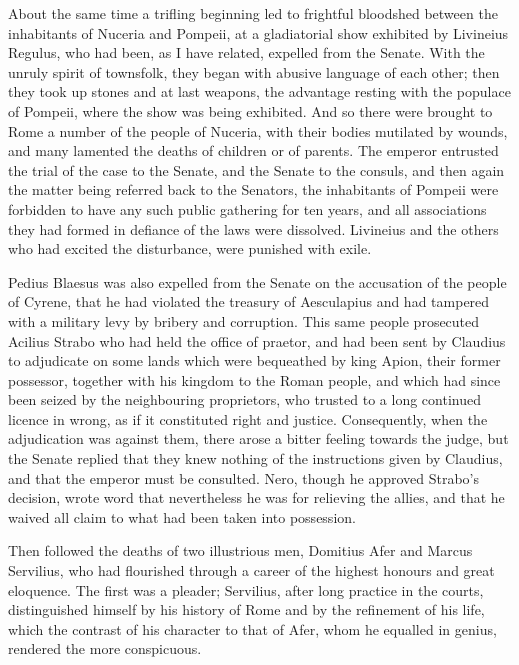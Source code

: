 
About the same time a trifling beginning led to frightful bloodshed between the inhabitants of Nuceria and Pompeii, at a gladiatorial show exhibited by Livineius Regulus, who had been, as I have related, expelled from the Senate. With the unruly spirit of townsfolk, they began with abusive language of each other; then they took up stones and at last weapons, the advantage resting with the populace of Pompeii, where the show was being exhibited. And so there were brought to Rome a number of the people of Nuceria, with their bodies mutilated by wounds, and many lamented the deaths of children or of parents. The emperor entrusted the trial of the case to the Senate, and the Senate to the consuls, and then again the matter being referred back to the Senators, the inhabitants of Pompeii were forbidden to have any such public gathering for ten years, and all associations they had formed in defiance of the laws were dissolved. Livineius and the others who had excited the disturbance, were punished with exile.


Pedius Blaesus was also expelled from the Senate on the accusation of the people of Cyrene, that he had violated the treasury of Aesculapius and had tampered with a military levy by bribery and corruption. This same people prosecuted Acilius Strabo who had held the office of praetor, and had been sent by Claudius to adjudicate on some lands which were bequeathed by king Apion, their former possessor, together with his kingdom to the Roman people, and which had since been seized by the neighbouring proprietors, who trusted to a long continued licence in wrong, as if it constituted right and justice. Consequently, when the adjudication was against them, there arose a bitter feeling towards the judge, but the Senate replied that they knew nothing of the instructions given by Claudius, and that the emperor must be consulted. Nero, though he approved Strabo's decision, wrote word that nevertheless he was for relieving the allies, and that he waived all claim to what had been taken into possession.


Then followed the deaths of two illustrious men, Domitius Afer and Marcus Servilius, who had flourished through a career of the highest honours and great eloquence. The first was a pleader; Servilius, after long practice in the courts, distinguished himself by his history of Rome and by the refinement of his life, which the contrast of his character to that of Afer, whom he equalled in genius, rendered the more conspicuous.

